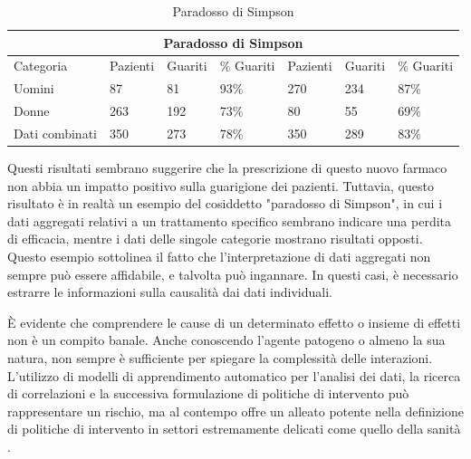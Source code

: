 \begin{table}[H]
    \centering
    \caption{Paradosso di Simpson}
    \begin{tabular}{ |p{2.2cm}||p{1.6cm}|p{1.6cm}|p{1.6cm}||p{1.6cm}|p{1.6cm}|p{1.6cm}| }
        \hline
        \multicolumn{7}{|c|}{Paradosso di Simpson} \\
        \hline
        Categoria & Pazienti & Guariti & \% Guariti & Pazienti & Guariti & \% Guariti\\
        \hline
        Uomini & 87 & 81 & 93\% & 270 & 234 & 87\% \\
        Donne & 263 & 192 & 73\% & 80 & 55 & 69\% \\
        Dati combinati & 350 & 273 & 78\% & 350 & 289 & 83\% \\
        \hline
    \end{tabular}
\end{table}

Questi risultati sembrano suggerire che la prescrizione di questo 
nuovo farmaco non abbia un impatto positivo sulla guarigione dei 
pazienti. Tuttavia, questo risultato è in realtà un esempio del 
cosiddetto "paradosso di Simpson", in cui i dati aggregati relativi 
a un trattamento specifico sembrano indicare una perdita di efficacia, 
mentre i dati delle singole categorie mostrano risultati opposti. 
Questo esempio sottolinea il fatto che l'interpretazione di dati 
aggregati non sempre può essere affidabile, e talvolta può ingannare. 
In questi casi, è necessario estrarre le informazioni sulla causalità 
dai dati individuali.

È evidente che comprendere le cause di un determinato effetto o 
insieme di effetti non è un compito banale. Anche conoscendo 
l'agente patogeno o almeno la sua natura, non sempre è sufficiente 
per spiegare la complessità delle interazioni. 
L'utilizzo di modelli di apprendimento automatico per l'analisi dei 
dati, la ricerca di correlazioni e la successiva formulazione di 
politiche di intervento può rappresentare un rischio, ma al contempo 
offre un alleato potente nella definizione di politiche di intervento 
in settori estremamente delicati come quello della sanità 
\cite{doi:10.1098/rsos.220638}.